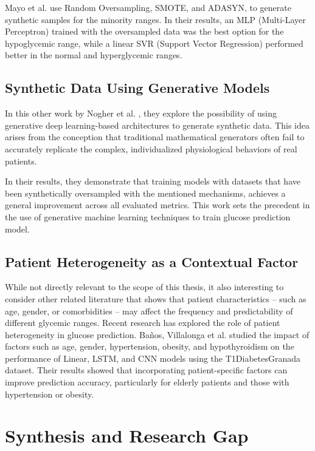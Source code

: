 Mayo et al. use Random Oversampling, SMOTE, and ADASYN, to generate synthetic samples for the minority ranges. In their results, an MLP (Multi-Layer Perceptron) trained with the oversampled data was the best option for the hypoglycemic range, while a linear SVR (Support Vector Regression) performed better in the normal and hyperglycemic ranges.

\subsection{Synthetic Data Using Generative Models}
\label{subsec:soa_over_sampling_gnn}

In this other work by Nogher et al. \cite{s22134944}, they explore the possibility of using generative deep learning-based architectures to generate synthetic data. This idea arises from the conception that traditional mathematical generators often fail to accurately replicate the complex, individualized physiological behaviors of real patients.

In their results, they demonstrate that training models with datasets that have been synthetically oversampled with the mentioned mechanisms, achieves a general improvement across all evaluated metrics. This work sets the precedent in the use of generative machine learning techniques to train glucose prediction model.

\subsection{Patient Heterogeneity as a Contextual Factor}
\label{subsec:soa_patient_heterogeneity}

While not directly relevant to the scope of this thesis, it also interesting to consider other related literature that shows that patient characteristics -- such as age, gender, or comorbidities --  may affect the frequency and predictability of different glycemic ranges. Recent research has explored the role of patient heterogeneity in glucose prediction. Baños, Villalonga et al. \cite{10.1007/978-3-032-02725-2_51} studied the impact of factors such as age, gender, hypertension, obesity, and hypothyroidism on the performance of Linear, LSTM, and CNN models using the T1DiabetesGranada dataset. Their results showed that incorporating patient-specific factors can improve prediction accuracy, particularly for elderly patients and those with hypertension or obesity.

\section{Synthesis and Research Gap}
\label{sec:research_gap}

